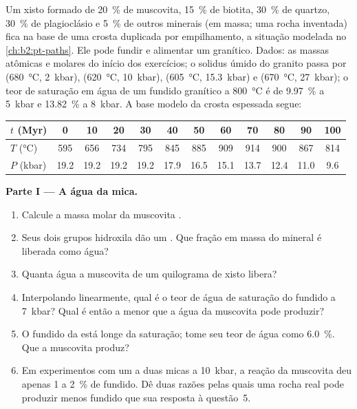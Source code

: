\begin{problem}\label{pb:b2:crustal-melting:1}
Um xisto formado de \qty{20}{\percent} de muscovita, \qty{15}{\percent} de biotita,
\qty{30}{\percent} de quartzo, \qty{30}{\percent} de plagioclásio e \qty{5}{\percent} de outros
minerais (em massa; uma rocha inventada) fica na base de uma crosta duplicada por empilhamento, a
situação modelada no \cref{ch:b2:pt-paths}. Ele pode fundir e alimentar um  granítico. Dados:
as massas atômicas e molares do início dos exercícios; o solidus úmido do granito passa
por (\qty{680}{\celsius}, \qty{2}{kbar}), (\qty{620}{\celsius}, \qty{10}{kbar}),
(\qty{605}{\celsius}, \qty{15.3}{kbar}) e (\qty{670}{\celsius}, \qty{27}{kbar}); o
teor de saturação em água de um fundido granítico a \qty{800}{\celsius} é de \qty{9.97}{\percent} a
\qty{5}{kbar} e \qty{13.82}{\percent} a \qty{8}{kbar}. A base modelo da crosta espessada segue:

\smallskip
\begin{center}\small
\begin{tabular}{l|ccccccccccc}
$t$ (\unit{Myr}) & 0 & 10 & 20 & 30 & 40 & 50 & 60 & 70 & 80 & 90 & 100\\ \hline
$T$ (\unit{\celsius}) & 595 & 656 & 734 & 795 & 845 & 885 & 909 & 914 & 900 & 867 & 814\\
$P$ (\unit{kbar}) & 19.2 & 19.2 & 19.2 & 19.2 & 17.9 & 16.5 & 15.1 & 13.7 & 12.4 & 11.0 & 9.6
\end{tabular}
\end{center}
\smallskip

\noindent\textbf{Parte I --- A água da mica.}
\begin{enumerate}
\item Calcule a massa molar da muscovita .
\item Seus dois grupos hidroxila dão um . Que fração em massa do mineral é
liberada como água?
\item Quanta água a muscovita de um quilograma de xisto libera?
\item Interpolando linearmente, qual é o teor de água de saturação do fundido a
\qty{7}{kbar}? Qual é então a menor  que a água da muscovita pode produzir?
\item O fundido da  está longe da saturação; tome seu teor de água como
\qty{6.0}{\percent}. Que  a muscovita produz?
\item Em experimentos com um  a duas micas a \qty{10}{kbar}, a reação da muscovita
deu apenas 1 a \qty{2}{\percent} de fundido. Dê duas razões pelas quais uma rocha real pode produzir menos
fundido que sua resposta à questão~5.
\end{enumerate}


\end{problem}
